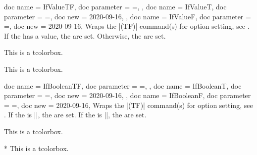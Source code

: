 \medskip

\begin{docTcbKeys}[doc description = {no default}]
  {
    {
      doc name        = IfValueTF,
      doc parameter   = {=},
    },
    {
      doc name        = IfValueT,
      doc parameter   = {=},
      doc new         = 2020-09-16,
    },
    {
      doc name        = IfValueF,
      doc parameter   = {=},
      doc new         = 2020-09-16,
    }
  }
  Wraps the |\IfValue(TF)| command(s) for option setting, see \cite{latexproject:usrguide}.
  If the  has a value, the  are set.
  Otherwise, the  are set.
\begin{dispExample}

\begin{mybox}
This is a tcolorbox.
\end{mybox}

\begin{mybox}[My title]
This is a tcolorbox.
\end{mybox}
\end{dispExample}
\end{docTcbKeys}

\clearpage

\begin{docTcbKeys}[doc description = {no default}]
  {
    {
      doc name        = IfBooleanTF,
      doc parameter   = {=},
    },
    {
      doc name        = IfBooleanT,
      doc parameter   = {=},
      doc new         = 2020-09-16,
    },
    {
      doc name        = IfBooleanF,
      doc parameter   = {=},
      doc new         = 2020-09-16,
    }
  }
  Wraps the |\IfBoolean(TF)| command(s) for option setting, see \cite{latexproject:usrguide}.
  If the  is |\BooleanTrue|, the  are set.
  If the  is |\BooleanFalse|, the  are set.

\begin{dispExample}

\begin{mybox}
This is a tcolorbox.
\end{mybox}

\begin{mybox}*
This is a tcolorbox.
\end{mybox}
\end{dispExample}
\end{docTcbKeys}




